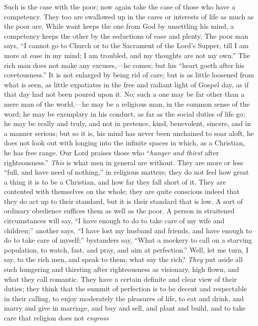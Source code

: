 Such is the case with the poor; now again take the case of those
who have a competency. They too are swallowed up in the cares or
interests of life as much as the poor are. While want keeps the one
from God by unsettling his mind, a competency keeps the other by the
seductions of ease and plenty. The poor man says, ``I cannot go to
Church or to the Sacrament of the Lord's Supper, till I am more at
ease in my mind; I am troubled, and my thoughts are not my own.''
The rich man does not make any excuses,—he comes; but his
``heart goeth after his covetousness.'' It is not enlarged by
being rid of care; but is as little loosened from what is seen, as
little expatiates in the free and radiant light of Gospel day, as if
that day had not been poured upon it. No; such a one may be far other
than a mere man of the world,—he may be a religious man, in the
common sense of the word; he may be exemplary in his conduct, as far
as the social duties of life go; he may be really and truly, and not
in pretence, kind, benevolent, sincere, and in a manner serious; but
so it is, his mind has never been unchained to soar aloft, he does not
look out with longing into the infinite spaces in which, as a
Christian, he has free range. Our Lord praises those who ``\emph{hunger
and thirst} after righteousness.'' \emph{This} is what men in
general are without. They are more or less ``full, and have need
of nothing,'' in religious matters; they do not feel how great a
thing it is to be a Christian, and how far they fall short of it. They
are contented with themselves on the whole; they are quite conscious
indeed that they do act up to their standard, but it is their standard
that is low. A sort of ordinary obedience suffices them as well as the
poor. A person in straitened circumstances will say, ``I have
enough to do to take care of my wife and children;'' another says,
``I have lost my husband and friends, and have enough to do to
take care of myself;'' bystanders say, ``What a mockery to
call on a starving population, to watch, fast, and pray, and aim at
perfection.'' Well, let me turn, I say, to the rich men, and speak
to them; what say the rich? \emph{They} put aside all such hungering
and thirsting after righteousness as visionary, high flown, and what
they call romantic. They have a certain definite and clear view of
their duties; they think that the summit of perfection is to be decent
and respectable in their calling, to enjoy moderately the pleasures of
life, to eat and drink, and marry and give in marriage, and buy and
sell, and plant and build, and to take care that religion does not \emph{engross}
